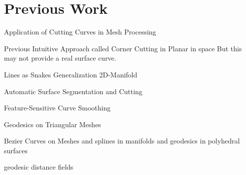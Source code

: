\documentclass{stdlocal}
\begin{document}
\section{Previous Work} %
\label{sec:previous_work}

  Application of Cutting Curves in Mesh Processing
  \autocite{zachow2003}
  \autocite{benhabiles2011}
  \autocite{ji2006}

  Previous Intuitive Approach called Corner Cutting in Planar
  \autocite{chaikin1974}
  \autocite{dyn1992}
  in space
  \autocite{morera2008}
  But this may not provide a real surface curve.

  Lines as Snakes
  \autocite{kass1988}
  Generalization 2D-Manifold
  \autocite{bischoff2005}
  \autocite{jung2004}

  Automatic Surface Segmentation and Cutting
  \autocite{lee2002}
  \autocite{lee2004}

  Feature-Sensitive Curve Smoothing
  \autocite{lai2007}

  Geodesics on Triangular Meshes
  \autocite{martinez2005}

  Bezier Curves on Meshes
  \autocite{martinez2007}
  and splines in manifolds
  \autocite{hofer2004}
  and geodesics in polyhedral surfaces
  \autocite{polthier2006}
  \autocite{mitchell1987}
  \autocite{surazhsky2005}

  geodesic distance fields
  \autocite{bommes2007}
  \autocite{kimmel1996}

\end{document}
